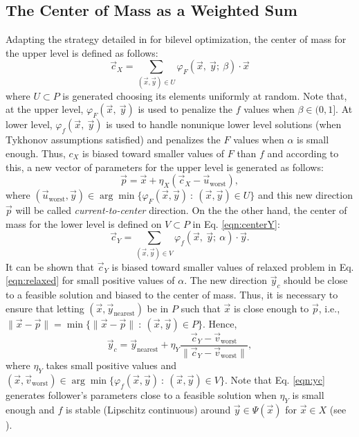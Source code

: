 \documentclass[conference]{IEEEtran}
\theoremstyle{definition}
\begin{document}
\subsection{The Center of Mass as a Weighted Sum} %
\label{sub:the_center_of_mass_as_a_weighted_sum}
% 
Adapting the strategy detailed in \cite{Mejia2018} for bilevel optimization, the
center of mass for the upper level is defined as follows:
% 
\begin{equation}
    \vec{c}_X = \sum_{(\vec{x}, \vec{y})\in U} \varphi_F(\vec{x},\ \vec{y}; \ \beta) \cdot \vec{x}
    \label{eqn:centerX}
\end{equation}
% 
where $U \subset P$ is generated choosing its elements uniformly at random.
Note that, at the upper level, $\varphi_F (\vec{x},\ \vec{y})$ is used to penalize
the $f$ values when $\beta\in (0, 1]$. At lower level, $\varphi_f (\vec{x},\ \vec{y})$
is used to handle nonunique lower level solutions (when Tykhonov assumptions 
satisfied) and penalizes the $F$ values when $\alpha$ is small enough. Thus, $c_X$
is biased toward smaller values of $F$ than $f$ and according to this, a new vector
of parameters for the upper level is generated as follows:
% 
\begin{equation}
    \vec{p} = \vec{x} + \eta_{X} (\vec{c}_X - \vec{u}_{\text{worst}}),
	\label{eqn:leaderp}
\end{equation}
% 
where
$
    (\vec{u}_{\text{worst}}, \vec{y}) \in \arg \min \{\varphi_F(\vec{x}, \vec{y} )  \ : \ (\vec{x}, \vec{y}) \in U \} 
$ %
% 
and this new direction $\vec{p}$ will be called \textit{current-to-center} direction. %
On the the other hand, the center of mass for the lower level is defined on
$V \subset P$ in Eq. \ref{eqn:centerY}:
% 
\begin{equation}
    \vec{c}_Y = \sum_{(\vec{x}, \vec{y})\in V} \varphi_f(\vec{x},\ \vec{y};\ \alpha) \cdot \vec{y}.
    \label{eqn:centerY}
\end{equation}
% 
It can be shown that $\vec{c}_Y$ is biased toward smaller values of relaxed
problem in Eq. \ref{eqn:relaxed} for small positive values of $\alpha$.
% 
The new direction $\vec{y}_c$ should be close to a feasible solution and biased
to the center of mass. Thus, it is necessary to ensure that letting $(\vec{x}, \vec{y}_{\text{nearest}}) $
be in $P$ such that $\vec{x}$ is close enough to $\vec{p}$, i.e., $ \| \vec{x} - \vec{p} \| = \min\{ \| \vec{x} - \vec{p} \| \ : \ (\vec{x}, \vec{y}) \in P  \} $.
Hence,
\begin{equation}
    \vec{y}_c = \vec{y}_{\text{nearest}} + \eta_{Y} \dfrac{\vec{c}_Y - \vec{v}_{\text{worst}}}{\| \vec{c}_Y - \vec{v}_{\text{worst}} \|},
    \label{eqn:yc}
\end{equation} %
% 
where $\eta_Y$ takes small positive values and 
% 
$
    (\vec{x}, \vec{v}_{\text{worst}}) \in \arg \min \{\varphi_f(\vec{x}, \vec{y} )  \ : \ (\vec{x}, \vec{y}) \in V \}
$. Note that Eq. \ref{eqn:yc} generates follower's parameters close to a feasible
solution when $\eta_{Y}$ is small enough and $f$ is stable (Lipschitz continuous)
around $\vec{y} \in \Psi(\vec{x}) $ for  $\vec{x} \in X$ (see \cite{dempe2002foundations}). %
% 
\end{document}
